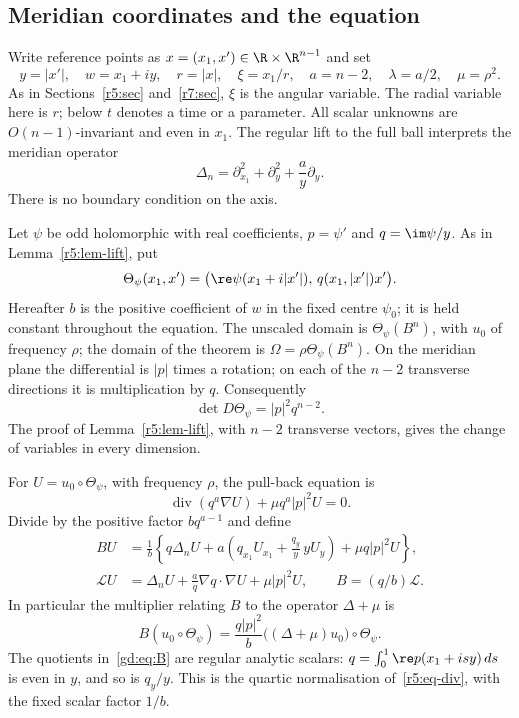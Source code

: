 \subsection{Meridian coordinates and the equation}\label{gd:sec:formulation}
Write reference points as $x=(x_1,x')\in\R\times\R^{n-1}$ and set
\[
 y=|x'|,\quad w=x_1+iy,\quad r=|x|,\quad \xi=x_1/r,\quad
 a=n-2,\quad\lambda=a/2,\quad\mu=\rho^2.
\]
As in Sections~\ref{r5:sec} and~\ref{r7:sec}, $\xi$ is the angular
variable. The radial variable here is $r$; below $t$ denotes a time or
a parameter.
All scalar unknowns are $O(n-1)$-invariant and even in $x_1$.
The regular lift to the full ball interprets the meridian operator
\begin{equation}\label{gd:eq:laplacian}
 \Delta_n=\partial_{x_1}^2+\partial_y^2+\frac a y\partial_y .
\end{equation}
There is no boundary condition on the axis.

Let $\psi$ be odd holomorphic with real coefficients, $p=\psi'$ and
$q=\im\psi/y$. As in Lemma~\ref{r5:lem-lift}, put
\begin{equation}\label{gd:eq:lift-map}
 \Theta_\psi(x_1,x')=
 \bigl(\re\psi(x_1+i|x'|),\,q(x_1,|x'|)x'\bigr).
\end{equation}
Hereafter $b$ is the positive coefficient of $w$ in the fixed centre
$\psi_0$; it is held constant throughout the equation.
The unscaled domain is $\Theta_\psi(B^n)$, with $u_0$ of frequency
$\rho$; the domain of the theorem is $\Omega=\rho\Theta_\psi(B^n)$.
On the meridian plane the differential is $|p|$ times a rotation;
on each of the $n-2$ transverse directions it is multiplication by $q$.
Consequently
\[
 \det D\Theta_\psi=|p|^2q^{n-2}.
\]
The proof of Lemma~\ref{r5:lem-lift}, with $n-2$ transverse vectors,
gives the change of variables in every dimension.

For $U=u_0\circ\Theta_\psi$, with frequency $\rho$, the
pull-back equation is
\[
 \operatorname{div}(q^a\nabla U)+\mu q^a|p|^2U=0.
\]
Divide by the positive factor $bq^{a-1}$ and define
\begin{equation}\label{gd:eq:B}
 \begin{split}
 BU&=\frac1b\left\{q\Delta_n U+
 a\left(q_{x_1}U_{x_1}+\frac{q_y}{y}\,yU_y\right)
 +\mu q|p|^2U\right\},\\
 \mathcal L U&=\Delta_n U+\frac a q\nabla q\cdot\nabla U
                  +\mu|p|^2U,\qquad B=(q/b)\mathcal L .
 \end{split}
\end{equation}
In particular the multiplier relating $B$ to the operator $\Delta+\mu$ is
\begin{equation}\label{gd:eq:physical-multiplier}
 B(u_0\circ\Theta_\psi)=
 \frac{q|p|^2}{b}\bigl((\Delta+\mu)u_0\bigr)\circ\Theta_\psi .
\end{equation}
The quotients in~\eqref{gd:eq:B} are regular analytic scalars:
$q=\int_0^1\re p(x_1+isy)\,ds$ is even in $y$, and so is $q_y/y$.
This is the quartic normalisation of~\eqref{r5:eq-div}, with the
fixed scalar factor $1/b$.

